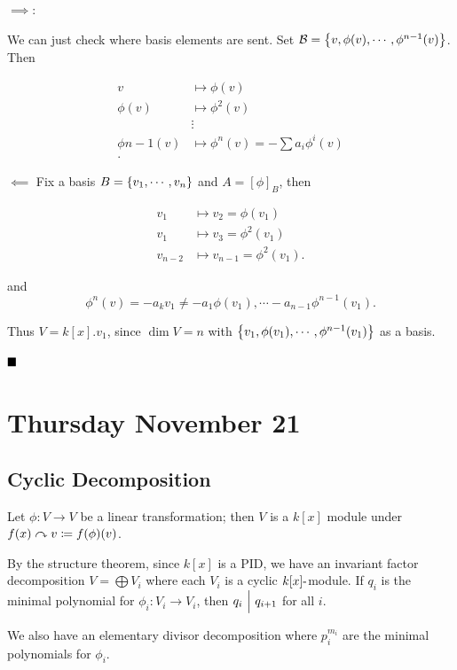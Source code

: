 \(\implies\):

We can just check where basis elements are sent. Set
\(\mathcal{B} = \left\{{v, \phi(v), \cdots, \phi^{n-1}(v)}\right\}\). Then

\begin{align*}
v &\mapsto \phi(v) \\
\phi(v) &\mapsto \phi^2(v) \\
&\vdots \\
\phi{n-1}(v) &\mapsto \phi^n(v)  = -\sum a_i \phi^i(v) \\
.\end{align*}

\(\impliedby\) Fix a basis \(B = \left\{{v_1, \cdots, v_n}\right\}\) and
\(A = [\phi]_B\), then

\begin{align*}
v_1 &\mapsto v_2 = \phi(v_1) \\
v_1 &\mapsto v_3 = \phi^2(v_1) \\
v_{n-2} &\mapsto v_{n-1} = \phi^2(v_1)
.\end{align*}

and \[
\phi^n(v) = -a_k v_1 \neq -a_1 \phi(v_1), \cdots -a_{n-1} \phi^{n-1}(v_1)
.\]

Thus \(V = k[x].v_1\), since \(\dim V = n\) with
\(\left\{{v_1, \phi(v_1), \cdots, \phi^{n-1}(v_1)}\right\}\) as a basis.

\(\qed\)

\hypertarget{thursday-november-21}{%
\section{Thursday November 21}\label{thursday-november-21}}

\hypertarget{cyclic-decomposition}{%
\subsection{Cyclic Decomposition}\label{cyclic-decomposition}}

Let \(\phi: V\to V\) be a linear transformation; then \(V\) is a
\(k[x]\) module under \(f(x) \curvearrowright v \coloneqq f(\phi)(v)\).

By the structure theorem, since \(k[x]\) is a PID, we have an invariant
factor decomposition \(V = \bigoplus V_i\) where each \(V_i\) is a
cyclic \(k[x]{\hbox{-}}\)module. If \(q_i\) is the minimal polynomial for
\(\phi_i: V_i \to V_i\), then \(q_{i} {~\Bigm| ~} q_{i+1}\) for all \(i\).

We also have an elementary divisor decomposition where \(p_i^{m_i}\) are
the minimal polynomials for \(\phi_i\).

